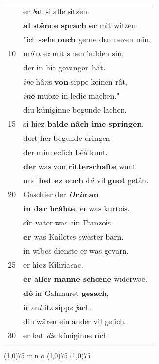 \documentclass[8pt,a4paper,notitlepage]{article}
\begin{document}
\begin{table}[ht]
\begin{minipage}[t]{0.5\linewidth}
\begin{tabular}{rl}
 & er \textit{b}at si alle sitzen.\\ 
 & \textbf{al stênde} \textbf{sprach er} mit witzen:\\ 
 & "ich sæhe \textbf{ouch} gerne den neven mîn,\\ 
10 & m\textit{ö}h\textit{t} e\textit{z} mit sînen hulden sîn,\\ 
 & der in hie gevangen hât.\\ 
 & \textit{in}e hâ\textit{n}s \textbf{von} sippe keinen rât,\\ 
 & \textit{i}\textbf{\textit{n}e} muoze in ledic machen."\\ 
 & diu küniginne begunde lachen.\\ 
15 & si hiez \textbf{balde} \textbf{nâch ime springen}.\\ 
 & dort her begunde dringen\\ 
 & der minneclîch bêâ kunt.\\ 
 & \textbf{der} was von \textbf{ritterschafte} wunt\\ 
 & und \textbf{het ez} \textbf{ouch} d\textit{â} vil \textbf{guot} getân.\\ 
20 & Gaschier der \textbf{\textit{O}r\textit{i}man}\\ 
 & \textbf{in dar brâhte}. er was kurtois.\\ 
 & sîn vater was ein Franzois.\\ 
 & \textbf{er} was Kailetes swester barn.\\ 
 & in wîbes dienste er was gevarn.\\ 
25 & er hiez Kiliria\textit{c}ac.\\ 
 & \textbf{er aller manne schœne} widerwac.\\ 
 & \textbf{dô} in Gahmuret \textbf{gesach},\\ 
 & ir an\textit{t}litz sipp\textit{e} \textit{j}ach.\\ 
 & diu wâren ein ander vil gelîch.\\ 
30 & er bat \textit{die} küniginne rîch\\ 
\end{tabular}
\scriptsize
\line(1,0){75} \newline
m n o \newline
\line(1,0){75} \newline
\newline
\line(1,0){75} \newline

\end{minipage}
\end{table}
\end{document}
